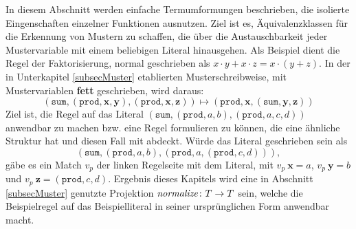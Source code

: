 In diesem Abschnitt werden einfache Termumformungen beschrieben, die isolierte Eingenschaften einzelner Funktionen ausnutzen. Ziel ist es, Äquivalenzklassen für die Erkennung von Mustern zu schaffen, die über die Austauschbarkeit jeder Mustervariable mit einem beliebigen Literal hinausgehen. Als Beispiel dient die Regel der Faktorisierung, normal geschrieben als $x \cdot y + x \cdot z = x \cdot (y + z)$. In der in Unterkapitel \ref{subsecMuster} etablierten Musterschreibweise, mit Mustervariablen \textbf{fett} geschrieben, wird daraus:
$$(\texttt{sum}, (\texttt{prod}, \mathbf x, \mathbf y), (\texttt{prod}, \mathbf x, \mathbf z)) \mapsto (\texttt{prod}, \mathbf x, (\texttt{sum}, \mathbf y, \mathbf z))$$
Ziel ist, die Regel auf das Literal $(\texttt{sum}, (\texttt{prod}, a, b), (\texttt{prod}, a, c, d))$ anwendbar zu machen bzw. eine Regel formulieren zu können, die eine ähnliche Struktur hat und diesen Fall mit abdeckt. 
Würde das Literal geschrieben sein als $$(\texttt{sum}, (\texttt{prod}, a, b), (\texttt{prod}, a, (\texttt{prod}, c, d))),$$ gäbe es ein Match $v_p$ der linken Regelseite mit dem Literal, mit $v_p~\mathbf x = a$, $v_p~\mathbf y = b$ und $v_p~\mathbf z = (\texttt{prod}, c, d)$. Ergebnis dieses Kapitels wird eine in Abschnitt \ref{subsecMuster} genutzte Projektion ${\mathit{normalize} \colon T \rightarrow T}$ sein, welche die Beispielregel auf das Beispielliteral in seiner ursprünglichen Form anwendbar macht.\\


